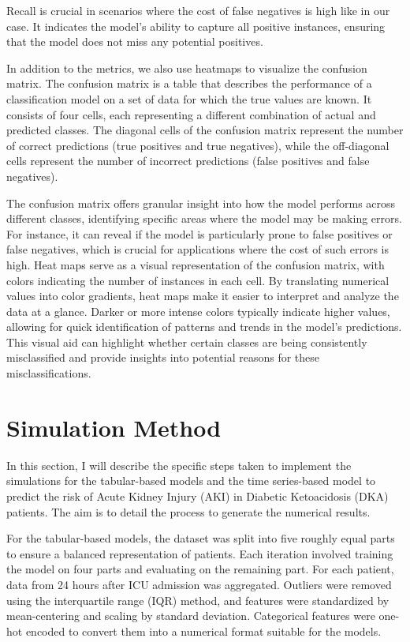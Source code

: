 \documentclass[../main.tex]{subfiles}
\begin{document}
Recall is crucial in scenarios where the cost of false negatives is high like in our case.
It indicates the model's ability to capture all positive instances, ensuring that the model does not miss any potential positives.

In addition to the metrics, we also use heatmaps to visualize the confusion matrix.
The confusion matrix is a table that describes the performance of a classification model on a set of data for which the true values are known.
It consists of four cells, each representing a different combination of actual and predicted classes.
The diagonal cells of the confusion matrix represent the number of correct predictions (true positives and true negatives), while the off-diagonal cells represent the number of incorrect predictions (false positives and false negatives).

The confusion matrix offers granular insight into how the model performs across different classes, identifying specific areas where the model may be making errors.
For instance, it can reveal if the model is particularly prone to false positives or false negatives, which is crucial for applications where the cost of such errors is high.
Heat maps serve as a visual representation of the confusion matrix, with colors indicating the number of instances in each cell.
By translating numerical values into color gradients, heat maps make it easier to interpret and analyze the data at a glance.
Darker or more intense colors typically indicate higher values, allowing for quick identification of patterns and trends in the model's predictions.
This visual aid can highlight whether certain classes are being consistently misclassified and provide insights into potential reasons for these misclassifications.


\section{Simulation Method}

In this section, I will describe the specific steps taken to implement the simulations for the tabular-based models and the time series-based model to predict the risk of Acute Kidney Injury (AKI) in Diabetic Ketoacidosis (DKA) patients. 
The aim is to detail the process to generate the numerical results.

For the tabular-based models, the dataset was split into five roughly equal parts to ensure a balanced representation of patients. 
Each iteration involved training the model on four parts and evaluating on the remaining part. 
For each patient, data from 24 hours after ICU admission was aggregated. 
Outliers were removed using the interquartile range (IQR) method, and features were standardized by mean-centering and scaling by standard deviation.
Categorical features were one-hot encoded to convert them into a numerical format suitable for the models.
\end{document}
